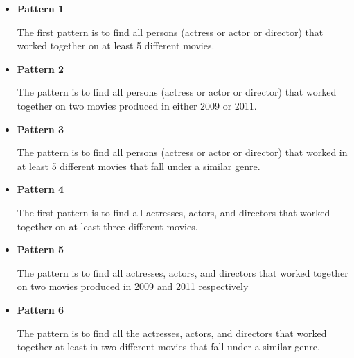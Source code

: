 \begin{itemize}

\item \textbf{Pattern 1}

The first pattern is to find all persons (actress or actor or director) that worked together on at least 5 different movies.

\item \textbf{Pattern 2}

The pattern is to find all persons (actress or actor or director) that worked together on two movies produced in either 2009 or 2011.

\item \textbf{Pattern 3}

The pattern is to find all persons (actress or actor or director) that worked in at least 5 different movies that fall under a similar genre.

\item \textbf{Pattern 4}

The first pattern is to find all actresses, actors, and directors that worked together on at least three different movies.

\item \textbf{Pattern 5}

The pattern is to find all actresses, actors, and directors that worked together on two movies produced in 2009 and 2011 respectively

\item \textbf{Pattern 6}

The pattern is to find all the actresses, actors, and directors that worked together at least in two different movies that fall under a similar genre.

\end{itemize}
